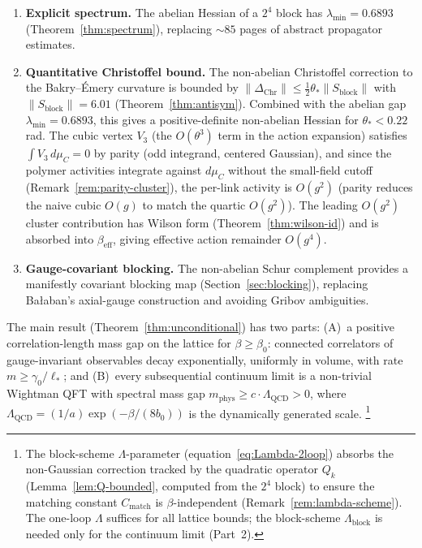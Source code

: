 \documentclass[11pt]{article}
\theoremstyle{definition}
\newcommand{\Lam}{\Lambda_{\mathrm{QCD}}}
\begin{document}
\begin{enumerate}[nosep]
\item \textbf{Explicit spectrum.}
The abelian Hessian of a $2^4$ block has $\lambda_{\min}=0.6893$
(Theorem~\ref{thm:spectrum}), replacing ${\sim}85$ pages of abstract
propagator estimates.

\item \textbf{Quantitative Christoffel bound.}
The non-abelian Christoffel correction to the Bakry--\'Emery curvature
is bounded by $\|\Delta_{\mathrm{Chr}}\|\le\frac{1}{2}\theta_*\|S_{\mathrm{block}}\|$
with $\|S_{\mathrm{block}}\|=6.01$
(Theorem~\ref{thm:antisym}).  Combined with the abelian gap
$\lambda_{\min}=0.6893$, this gives a positive-definite non-abelian
Hessian for $\theta_*<0.22$\,rad.  The cubic vertex $V_3$
(the $O(\theta^3)$ term in the action expansion) satisfies
$\int V_3\,d\mu_C=0$ by parity (odd integrand, centered Gaussian),
and since the polymer activities integrate against $d\mu_C$ without
the small-field cutoff (Remark~\ref{rem:parity-cluster}), the
per-link activity is $O(g^2)$ (parity reduces the naive cubic
$O(g)$ to match the quartic $O(g^2)$).  The leading $O(g^2)$
cluster contribution has Wilson form (Theorem~\ref{thm:wilson-id}) and is absorbed into
$\beta_{\mathrm{eff}}$, giving effective action remainder $O(g^4)$.

\item \textbf{Gauge-covariant blocking.}
The non-abelian Schur complement provides a manifestly covariant
blocking map (Section~\ref{sec:blocking}), replacing Ba\l aban's
axial-gauge construction and avoiding Gribov ambiguities.
\end{enumerate}

The main result (Theorem~\ref{thm:unconditional}) has two parts:
(A)~a positive correlation-length mass gap on the lattice for
$\beta\ge\beta_0$: connected correlators of gauge-invariant observables
decay exponentially, uniformly in volume, with rate
$m\ge\gamma_0/\ell_*$; and
(B)~every subsequential continuum limit is a non-trivial
Wightman QFT with spectral
mass gap $m_{\mathrm{phys}}\ge c\cdot\Lam>0$, where
$\Lam=(1/a)\exp(-\beta/(8b_0))$ is the dynamically generated scale.%
\footnote{The block-scheme $\Lambda$-parameter
(equation~\eqref{eq:Lambda-2loop}) absorbs the non-Gaussian
correction tracked by the quadratic operator $Q_k$
(Lemma~\ref{lem:Q-bounded}, computed from the $2^4$ block)
to ensure the matching constant $C_{\mathrm{match}}$
is $\beta$-independent (Remark~\ref{rem:lambda-scheme}).
The one-loop $\Lambda$ suffices for all lattice bounds;
the block-scheme $\Lambda_{\mathrm{block}}$ is needed
only for the continuum limit (Part~2).}
\end{document}
